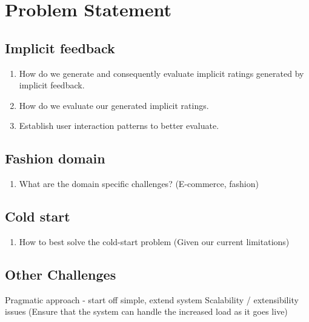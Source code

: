 \section{Problem Statement}

\subsection{Implicit feedback}
\begin{enumerate}
  \item How do we generate and consequently evaluate implicit ratings generated by implicit feedback.
  \item How do we evaluate our generated implicit ratings.
  \item Establish user interaction patterns to better evaluate.
\end{enumerate}

\subsection{Fashion domain}
\begin{enumerate}
  \item What are the domain specific challenges? (E-commerce, fashion)
\end{enumerate}

\subsection{Cold start}
\begin{enumerate}
  \item How to best solve the cold-start problem (Given our current limitations)
\end{enumerate}


\subsection{Other Challenges}
Pragmatic approach - start off simple, extend system
Scalability / extensibility issues (Ensure that the system can handle the increased load as it goes live)




